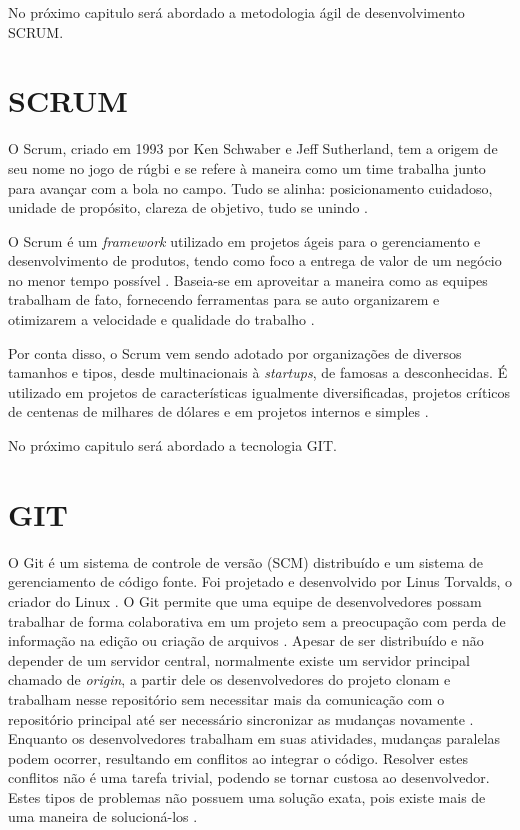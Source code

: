 No próximo capitulo será abordado a metodologia ágil de desenvolvimento SCRUM.
\section{SCRUM}
O Scrum, criado em 1993 por Ken Schwaber e Jeff Sutherland, tem a origem de seu nome no jogo de rúgbi e se refere à maneira como um time trabalha junto para avançar com a bola no campo. Tudo se alinha: posicionamento cuidadoso, unidade de propósito, clareza de objetivo, tudo se unindo \cite{rocha2015metodologia}.

O Scrum é um \textit{framework} utilizado em projetos ágeis para o gerenciamento e desenvolvimento de produtos, tendo como foco a entrega de valor de um negócio no menor tempo possível \cite{cruz2013scrum}. Baseia-se em aproveitar a maneira como as equipes trabalham de fato, fornecendo ferramentas para se auto organizarem e otimizarem a velocidade e qualidade do trabalho \cite{sutherland2016scrum}.

Por conta disso, o Scrum vem sendo adotado por organizações de diversos tamanhos e tipos, desde multinacionais à \textit{startups}, de famosas a desconhecidas. É utilizado em projetos de características igualmente diversificadas, projetos críticos de centenas de milhares de dólares e em projetos internos e simples \cite{sabbagh2014scrum}.

No próximo capitulo será abordado a tecnologia GIT.
\section{GIT}
O Git é um sistema de controle de versão (SCM) distribuído e um sistema de gerenciamento de código fonte. Foi projetado e desenvolvido por Linus Torvalds, o criador do Linux \cite{souzagerenciamento}.
O Git permite que uma equipe de desenvolvedores possam trabalhar de forma colaborativa em um projeto sem a preocupação com perda de informação na edição ou criação de arquivos \cite{konnorate2019importancia}.
Apesar de ser distribuído e não depender de um servidor central, normalmente existe um servidor principal chamado de \textit{origin}, a partir dele os desenvolvedores do projeto clonam e trabalham nesse repositório sem necessitar mais da comunicação com o repositório principal até ser necessário sincronizar as mudanças novamente \cite{cunha2018entendendo}.
Enquanto os desenvolvedores trabalham em suas atividades, mudanças paralelas podem ocorrer, resultando em conflitos ao integrar o código. Resolver estes conflitos não é uma tarefa trivial, podendo se tornar custosa ao desenvolvedor. Estes tipos de problemas não possuem uma solução exata, pois existe mais de uma maneira de solucioná-los \cite{cunha2018entendendo}.

